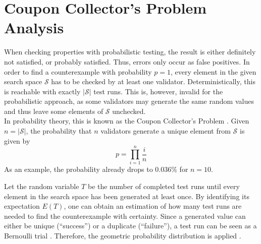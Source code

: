 \section{Coupon Collector's Problem Analysis}\label{sec:coupon}
When checking properties with probabilistic testing, the result is either definitely not satisfied, or probably satisfied. Thus, errors only occur as false positives. In order to find a counterexample with probability $p = 1$, every element in the given search space $\mathcal{S}$ has to be checked by at least one validator. Deterministically, this is reachable with exactly $|\mathcal{S}|$ test runs. This is, however, invalid for the probabilistic approach, as some validators may generate the same random values and thus leave some elements of $\mathcal{S}$ unchecked. \\
In probability theory, this is known as the Coupon Collector's Problem \cite{croucher_collecting_2006}. Given $n = |\mathcal{S}|$, the probability that $n$ validators generate a unique element from $\mathcal{S}$ is given by
\begin{equation*}
    p = \prod_{i=1}^{n} \frac{i}{n}
\end{equation*}
As an example, the probability already drops to $0.036\%$ for $n = 10$.

Let the random variable $T$ be the number of completed test runs until every element in the search space has been generated at least once. By identifying its expectation $E(T)$, one can obtain an estimation of how many test runs are needed to find the counterexample with certainty. Since a generated value can either be unique (``success'') or a duplicate (``failure''), a test run can be seen as a Bernoulli trial \cite{papoulis02}. Therefore, the geometric probability distribution is applied \cite{croucher_collecting_2006}.

